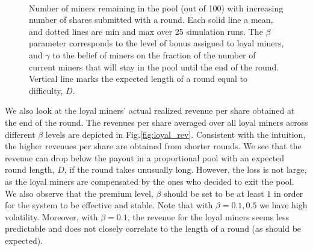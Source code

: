 \documentclass{article}
\theoremstyle{plain}
\theoremstyle{definition}
\begin{document}
\begin{figure}[H]
\center
{}\\
\caption{Number of miners remaining in the pool (out of 100)
with increasing number of shares submitted with a round.
Each solid line a mean, and dotted lines are min and max over 25 simulation 
runs. The $\beta$ parameter corresponds to the level of bonus assigned to 
loyal miners, and $\gamma$ to the belief of miners on the fraction 
of the number of current miners that will stay in the pool until the end
of the round. Vertical line marks the expected length of a round equal to 
difficulty, $D$.}
\label{fig:pool_size}
\end{figure}

We also look at the loyal miners' actual realized
revenue per share obtained at the end of the round. 
The revenues per share averaged over all loyal miners
across different $\beta$ levels are depicted in Fig.\ref{fig:loyal_rev}.
Consistent with the intuition, the higher revenues per share
are obtained from shorter rounds. We see that the revenue
can drop below the payout in a proportional pool with
an expected round length, $D$, if the round takes 
unusually long. However, the loss is not large, as
the loyal miners are compensated by the ones who
decided to exit the pool. We also observe that 
the premium level, $\beta$ should be set to be at least $1$
in order for the system to be effective and stable.
Note that with $\beta = 0.1, 0.5$ we have high volatility.
Moreover, with $\beta = 0.1$, the revenue for the loyal miners 
seems less predictable and does not closely correlate
to the length of a round (as should be expected).
\end{document}
